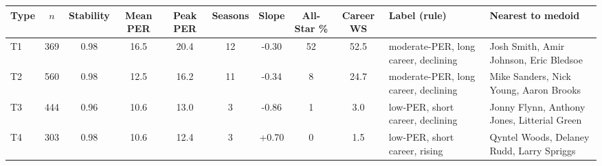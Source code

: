 \begin{tabular}{lcccccccclp{3.6cm}}\toprule
Type & $n$ & Stability & Mean PER & Peak PER & Seasons & Slope & All-Star \% & Career WS & Label (rule) & Nearest to medoid \\ \midrule
T1 & 369 & 0.98 & 16.5 & 20.4 & 12 & -0.30 & 52 & 52.5 & moderate-PER, long career, declining & Josh Smith, Amir Johnson, Eric Bledsoe \\
T2 & 560 & 0.98 & 12.5 & 16.2 & 11 & -0.34 & 8 & 24.7 & moderate-PER, long career, declining & Mike Sanders, Nick Young, Aaron Brooks \\
T3 & 444 & 0.96 & 10.6 & 13.0 & 3 & -0.86 & 1 & 3.0 & low-PER, short career, declining & Jonny Flynn, Anthony Jones, Litterial Green \\
T4 & 303 & 0.98 & 10.6 & 12.4 & 3 & +0.70 & 0 & 1.5 & low-PER, short career, rising & Qyntel Woods, Delaney Rudd, Larry Spriggs \\
\bottomrule\end{tabular}
